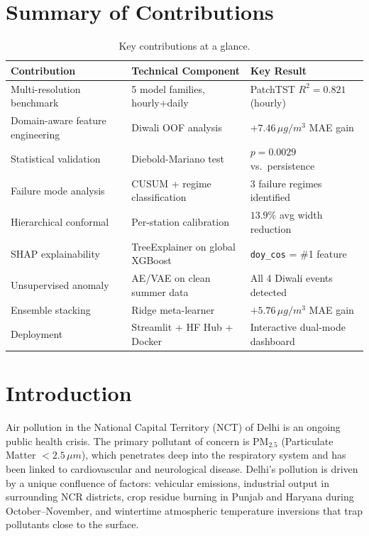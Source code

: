 \documentclass[11pt,a4paper]{article}
\begin{document}
\section*{Summary of Contributions}
\begin{table}[H]
    \centering
    \caption{Key contributions at a glance.}
    \label{tab:contributions}
    \begin{tabular}{lll}
        \toprule
        \textbf{Contribution} & \textbf{Technical Component} & \textbf{Key Result} \\
        \midrule
        Multi-resolution benchmark    & 5 model families, hourly+daily         & PatchTST $R^2{=}0.821$ (hourly) \\
        Domain-aware feature engineering & Diwali OOF analysis                 & $+7.46\,\mu g/m^3$ MAE gain \\
        Statistical validation        & Diebold-Mariano test                   & $p{=}0.0029$ vs.\ persistence \\
        Failure mode analysis         & CUSUM + regime classification          & 3 failure regimes identified \\
        Hierarchical conformal        & Per-station calibration                & $13.9\%$ avg width reduction \\
        SHAP explainability           & TreeExplainer on global XGBoost        & \texttt{doy\_cos} = \#1 feature \\
        Unsupervised anomaly          & AE/VAE on clean summer data            & All 4 Diwali events detected \\
        Ensemble stacking             & Ridge meta-learner                     & $+5.76\,\mu g/m^3$ MAE gain \\
        Deployment                    & Streamlit + HF Hub + Docker            & Interactive dual-mode dashboard \\
        \bottomrule
    \end{tabular}
\end{table}

\section{Introduction}
Air pollution in the National Capital Territory (NCT) of Delhi is an ongoing public health crisis. The primary pollutant of concern is PM$_{2.5}$ (Particulate Matter $< 2.5\,\mu m$), which penetrates deep into the respiratory system and has been linked to cardiovascular and neurological disease. Delhi's pollution is driven by a unique confluence of factors: vehicular emissions, industrial output in surrounding NCR districts, crop residue burning in Punjab and Haryana during October--November, and wintertime atmospheric temperature inversions that trap pollutants close to the surface.
\end{document}
